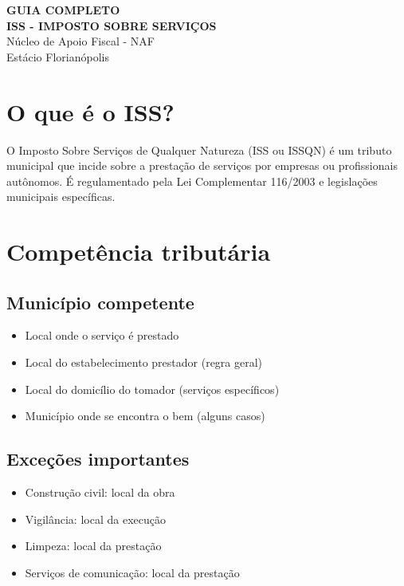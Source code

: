 \documentclass[12pt,a4paper]{article}
\begin{document}
\begin{center}
{\LARGE \textbf{GUIA COMPLETO}}\\[0.5cm]
{\Large \textbf{ISS - IMPOSTO SOBRE SERVIÇOS}}\\[0.5cm]
{\large Núcleo de Apoio Fiscal - NAF}\\
{\large Estácio Florianópolis}\\[1cm]
\end{center}

\section{O que é o ISS?}

O Imposto Sobre Serviços de Qualquer Natureza (ISS ou ISSQN) é um tributo municipal que incide sobre a prestação de serviços por empresas ou profissionais autônomos. É regulamentado pela Lei Complementar 116/2003 e legislações municipais específicas.

\section{Competência tributária}

\subsection{Município competente}
\begin{itemize}
    \item Local onde o serviço é prestado
    \item Local do estabelecimento prestador (regra geral)
    \item Local do domicílio do tomador (serviços específicos)
    \item Município onde se encontra o bem (alguns casos)
\end{itemize}

\subsection{Exceções importantes}
\begin{itemize}
    \item Construção civil: local da obra
    \item Vigilância: local da execução
    \item Limpeza: local da prestação
    \item Serviços de comunicação: local da prestação
\end{itemize}
\end{document}
